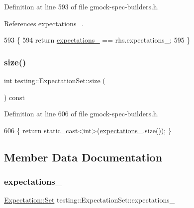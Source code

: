 Definition at line 593 of file gmock-\/spec-\/builders.\+h.



References expectations\+\_\+.


\begin{DoxyCode}
593                                                    \{
594     \textcolor{keywordflow}{return} \hyperlink{classtesting_1_1ExpectationSet_a3f00dd7a10f85858b12d70f4cae568c2}{expectations\_} == rhs.expectations\_;
595   \}
\end{DoxyCode}
\mbox{\label{classtesting_1_1ExpectationSet_a0941a29f03582a20c5eeabb5bf095f49}} 
\subsubsection{\texorpdfstring{size()}{size()}}
{\footnotesize\ttfamily int testing\+::\+Expectation\+Set\+::size (\begin{DoxyParamCaption}{ }\end{DoxyParamCaption}) const\hspace{0.3cm}{\ttfamily [inline]}}



Definition at line 606 of file gmock-\/spec-\/builders.\+h.


\begin{DoxyCode}
606 \{ \textcolor{keywordflow}{return} \textcolor{keyword}{static\_cast<}\textcolor{keywordtype}{int}\textcolor{keyword}{>}(\hyperlink{classtesting_1_1ExpectationSet_a3f00dd7a10f85858b12d70f4cae568c2}{expectations\_}.size()); \}
\end{DoxyCode}


\subsection{Member Data Documentation}
\mbox{\label{classtesting_1_1ExpectationSet_a3f00dd7a10f85858b12d70f4cae568c2}} 
\subsubsection{\texorpdfstring{expectations\+\_\+}{expectations\_}}
{\footnotesize\ttfamily \hyperlink{classtesting_1_1Expectation_a775955d57763c85daa8fda4b28ee2393}{Expectation\+::\+Set} testing\+::\+Expectation\+Set\+::expectations\+\_\+\hspace{0.3cm}{\ttfamily [private]}}



